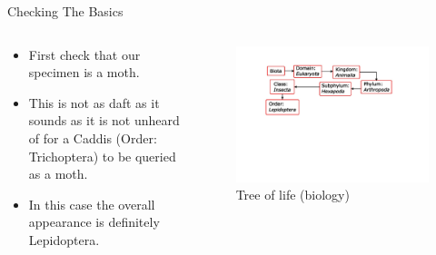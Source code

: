 \documentclass[
  ignorenonframetext,
]{beamer}
\providecommand{\tightlist}{%
  \setlength{\itemsep}{0pt}\setlength{\parskip}{0pt}}
\begin{document}
\begin{frame}{Checking The Basics}
\protect\hypertarget{checking-the-basics}{}
\begin{columns}[T]
\begin{column}{0.5\textwidth}
\begin{itemize}
\tightlist
\item
  First check that our specimen is a moth.
\item
  This is not as daft as it sounds as it is not unheard of for a Caddis
  (Order: Trichoptera) to be queried as a moth.
\item
  In this case the overall appearance is definitely Lepidoptera.
\end{itemize}
\end{column}

\begin{column}{0.5\textwidth}
\begin{figure}
\centering
\includegraphics{./images/order.jpg}
\caption{Tree of life (biology)}
\end{figure}
\end{column}
\end{columns}
\end{frame}
\end{document}
